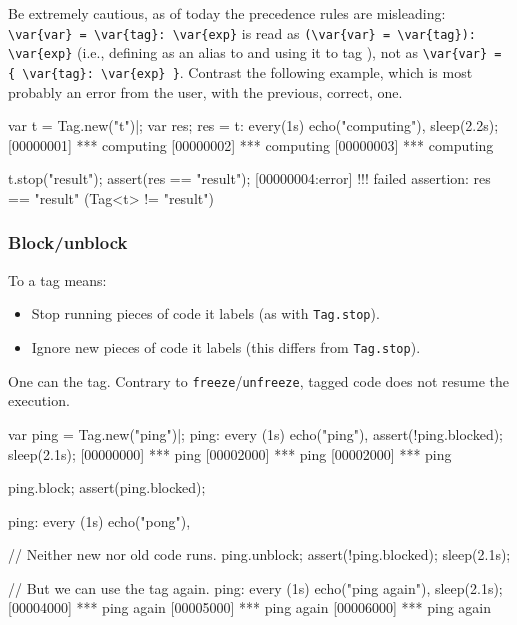 Be extremely cautious, as of today the precedence rules are
misleading: \lstinline|\var{var} = \var{tag}: \var{exp}| is read as
\lstinline|(\var{var} = \var{tag}): \var{exp}| (i.e., defining
 as an alias to  and using it to tag ), not as
\lstinline|\var{var} = { \var{tag}: \var{exp} }|.  Contrast the
following example, which is most probably an error from the user, with
the previous, correct, one.

\begin{urbiscript}
var t = Tag.new("t")|;
var res;
res = t: every(1s) echo("computing"),
sleep(2.2s);
[00000001] *** computing
[00000002] *** computing
[00000003] *** computing

t.stop("result");
assert(res == "result");
[00000004:error] !!! failed assertion: res == "result" (Tag<t> != "result")
\end{urbiscript}


\subsubsection{Block/unblock}
\label{sec:specs:tag:block}

To  a tag means:
\begin{itemize}
\item Stop running pieces of code it labels (as with
  \lstinline|Tag.stop|).
\item Ignore new pieces of code it labels (this differs from
  \lstinline|Tag.stop|).
\end{itemize}

One can  the tag.  Contrary to
\lstinline|freeze|/\lstinline|unfreeze|, tagged code does not resume
the execution.

\begin{urbiscript}
var ping = Tag.new("ping")|;
ping:
  every (1s)
    echo("ping"),
assert(!ping.blocked);
sleep(2.1s);
[00000000] *** ping
[00002000] *** ping
[00002000] *** ping

ping.block;
assert(ping.blocked);

ping:
  every (1s)
    echo("pong"),

// Neither new nor old code runs.
ping.unblock;
assert(!ping.blocked);
sleep(2.1s);

// But we can use the tag again.
ping:
  every (1s)
    echo("ping again"),
sleep(2.1s);
[00004000] *** ping again
[00005000] *** ping again
[00006000] *** ping again
\end{urbiscript}

